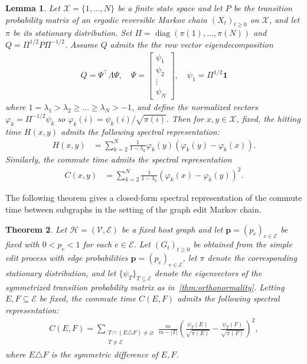 \documentclass[11pt,a4paper]{article}
\newtheorem{theorem}{Theorem}[section]
\newtheorem{lemma}[theorem]{Lemma}
\begin{document}
\begin{lemma}\label{lem:commute}
    Let $\mathcal X=\{1,\dots,N\}$ be a finite state space and let $P$ be the transition probability matrix of an ergodic reversible Markov chain $(X_t)_{t\geq 0}$ on $\mathcal X$, and let $\pi$ be its stationary distribution. Set $\Pi=\operatorname{diag}(\pi(1),\dots,\pi(N))$ and $Q=\Pi^{1/2} P \Pi^{-1/2}$. Assume $Q$ admits the the row vector eigendecomposition 
        \begin{align*}
            Q = \Psi^\top \Lambda \Psi, \quad 
            \Psi = \begin{bmatrix}
                \psi_1 \\
                \psi_2\\
                \vdots\\
                \psi_N
            \end{bmatrix},\quad
            \psi_1=\Pi^{1/2}\mathbf 1
        \end{align*}
    where $1=\lambda_1>\lambda_2\ge\dots\ge\lambda_N>-1$, and define the normalized vectors $\varphi_k=\Pi^{-1/2}\psi_k$ so $\varphi_k(i)=\psi_k(i)/\sqrt{\pi(i)}$. Then for $x, y\in\mathcal{X}$, fixed, the hitting time $H(x, y)$ admits the following spectral representation:
        \begin{align}\label{eq:hitting-time-spectral}
            H(x, y) &= \sum_{k=2}^N \frac{1}{1-\lambda_k} \varphi_k(y)(\varphi_k(y) - \varphi_k(x)).
        \end{align}
    Similarly, the commute time admits the spectral representation
        \begin{align}\label{eq:commute-time-spectral}
            C(x, y) &= \sum_{k=2}^N \frac{1}{1-\lambda_k} (\varphi_k(x) - \varphi_k(y))^2.
        \end{align}
\end{lemma}

The following theorem gives a closed-form spectral representation of the commute time between subgraphs in the setting of the graph edit Markov chain.

\begin{theorem}\label{thm:commute-time-spectral-gemc}
    Let $\mathcal{H} = (\mathcal{V},\mathcal{E})$ be a fixed host graph and let $\mathbf{p}=(p_e)_{e\in\mathcal{E}}$ be fixed with $0<p_e<1$ for each $e\in\mathcal{E}$. Let $(G_t)_{t\geq 0}$ be obtained from the simple edit process with edge probabilities $\mathbf{p} = (p_e)_{e\in\mathcal{E}}$, let $\pi$ denote the corresponding stationary distribution, and let $\{\psi_T\}_{T\subseteq\mathcal{E}}$ denote the eigenvectors of the symmetrized transition probability matrix as in~\cref{thm:orthonormality}. Letting $E, F\subseteq\mathcal{E}$ be fixed, the commute time $C(E, F)$ admits the following spectral representation:
        \begin{align}\label{eq:commute-time-gemc}
            C(E,F)=\sum_{\substack{T\cap (E\triangle F) \neq \varnothing\\ T\neq\mathcal{E}}}\frac{m}{m-|T|}\left(\frac{\psi_T(E)}{\sqrt{\pi(E)}}-\frac{\psi_T(F)}{\sqrt{\pi(F)}}\right)^2,
        \end{align}
    where $E\triangle F$ is the symmetric difference of $E, F$.
\end{theorem}
\end{document}
